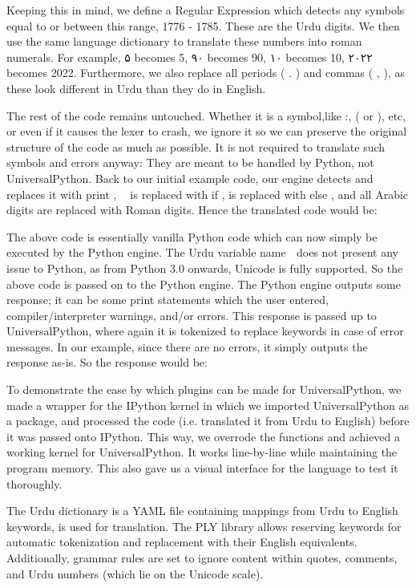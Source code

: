 \documentclass[conference]{IEEEtran}
\begin{document}
Keeping this in mind, we define a Regular Expression which detects any symbols equal to or between this range, 1776 - 1785. These are the Urdu digits. We then use the same language dictionary to translate these numbers into roman numerals. For example, ۵ becomes 5, ۹۰ becomes 90, ۱۰ becomes 10, ۲۰۲۲ becomes 2022.
Furthermore, we also replace all periods ( . ) and commas ( , ), as these look different in Urdu than they do in English.

The rest of the code remains untouched. Whether it is a symbol,like :, ( or ), etc, or even if it causes the lexer to crash, we ignore it so we can preserve the original structure of the code as much as possible. It is not required to translate such symbols and errors anyway: They are meant to be handled by Python, not UniversalPython. Back to our initial example code, our engine detects and replaces it with print , 􏰁􏰃 is replaced with if ,
is replaced with else , and all Arabic digits are replaced with Roman digits. Hence the translated code would be:

The above code is essentially vanilla Python code which can now simply be executed by the Python engine. The Urdu variable name 􏰀 does not present any issue to Python, as from Python 3.0 onwards, Unicode is fully supported. So the above code is passed on to the Python engine. The Python engine outputs some response; it can be some print statements which the user entered, compiler/interpreter warnings, and/or errors. This response is passed up to UniversalPython, where again it is tokenized to replace keywords in case of error messages. In our example, since there are no errors, it simply outputs the response as-is. So the response would be:

To demonstrate the ease by which plugins can be made for UniversalPython, we made a wrapper for the IPython kernel in which we imported UniversalPython as a package, and processed the code (i.e. translated it from Urdu to English) before it was passed onto IPython. This way, we overrode the functions and achieved a working kernel for UniversalPython. It works line-by-line while maintaining the program memory. This also gave us a visual interface for the language to test it thoroughly.

The Urdu dictionary is a YAML file containing mappings from Urdu to English keywords, is used for translation. The PLY library allows reserving keywords for automatic tokenization and replacement with their English equivalents. Additionally, grammar rules are set to ignore content within quotes, comments, and Urdu numbers (which lie on the Unicode scale).
\end{document}
